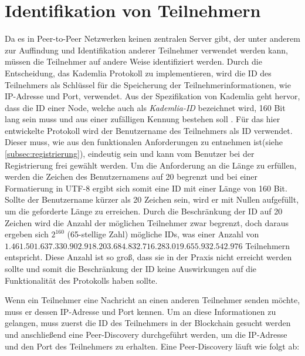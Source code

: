 \section{Identifikation von Teilnehmern}
\label{subsec:identifikation_von_teilnehmern}

Da es in Peer-to-Peer Netzwerken keinen zentralen Server gibt, der unter anderem zur Auffindung und Identifikation anderer Teilnehmer verwendet werden kann, müssen die Teilnehmer auf andere Weise identifiziert werden. Durch die Entscheidung, das Kademlia Protokoll zu implementieren, wird die ID des Teilnehmers als Schlüssel für die Speicherung der Teilnehmerinformationen, wie IP-Adresse und Port, verwendet.
Aus der Spezifikation von Kademlia geht hervor, dass die ID einer Node, welche auch als \textit{Kademlia-ID} bezeichnet wird, 160 Bit lang sein muss und aus einer zufälligen Kennung bestehen soll \parencite[S. 2]{Maymounkov_Kademlia}. Für das hier entwickelte Protokoll wird der Benutzername des Teilnehmers als ID verwendet. Dieser muss, wie aus den funktionalen Anforderungen zu entnehmen ist(siehe \ref{subsec:registrierung}), eindeutig sein und kann vom Benutzer bei der Registrierung frei gewählt werden. Um die Anforderung an die Länge zu erfüllen, werden die Zeichen des Benutzernamens auf 20 begrenzt und bei einer Formatierung in UTF-8 ergibt sich somit eine ID mit einer Länge von 160 Bit. Sollte der Benutzername kürzer als 20 Zeichen sein, wird er mit Nullen aufgefüllt, um die geforderte Länge zu erreichen.
Durch die Beschränkung der ID auf 20 Zeichen wird die Anzahl der möglichen Teilnehmer zwar begrenzt, doch daraus ergeben sich $2^{160}$ (65-stellige Zahl) mögliche IDs, was einer Anzahl von $1.461.501.637.330.902.918.203.684.832.716.283.019.655.932.542.976$ Teilnehmern entspricht. Diese Anzahl ist so groß, dass sie in der Praxis nicht erreicht werden sollte und somit die Beschränkung der ID keine Auswirkungen auf die Funktionalität des Protokolls haben sollte.

Wenn ein Teilnehmer eine Nachricht an einen anderen Teilnehmer senden möchte, muss er dessen IP-Adresse und Port kennen. Um an diese Informationen zu gelangen, muss zuerst die ID des Teilnehmers in der Blockchain gesucht werden und anschließend eine Peer-Discovery durchgeführt werden, um die IP-Adresse und den Port des Teilnehmers zu erhalten. Eine Peer-Discovery läuft wie folgt ab:

